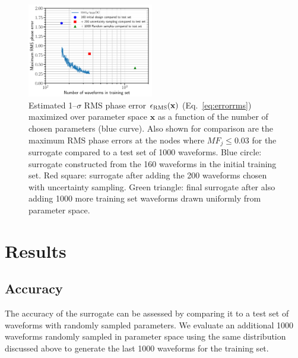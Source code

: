 \documentclass[prd,aps,letter,twocolumn,floatfix,notitlepage,nofootinbib]{revtex4-1}
\def\bx{\mathbf{x}}
\begin{document}
\begin{figure}[htb]
\centering
\includegraphics[width=0.49\textwidth]{uncertaintysampling.pdf}
\caption{Estimated 1--$\sigma$ RMS phase error $\epsilon_{\rm RMS}(\bx)$ (Eq.~\eqref{eq:errorrms}) maximized over parameter space $\bx$ as a function of the number of chosen parameters (blue curve). Also shown for comparison are the maximum RMS phase errors at the nodes where $MF_j \le 0.03$ for the surrogate compared to a test set of 1000 waveforms. Blue circle: surrogate constructed from the 160 waveforms in the initial training set. Red square: surrogate after adding the 200 waveforms chosen with uncertainty sampling. Green triangle: final surrogate after also adding 1000 more training set waveforms drawn uniformly from parameter space. }
\label{fig:uncsamp}
\end{figure}





\section{Results}

\subsection{Accuracy}
\label{sec:accuracy}

The accuracy of the surrogate can be assessed by comparing it to a test set of waveforms with randomly sampled parameters. We evaluate an additional 1000 waveforms randomly sampled in parameter space using the same distribution discussed above to generate the last 1000 waveforms for the training set.
\end{document}
